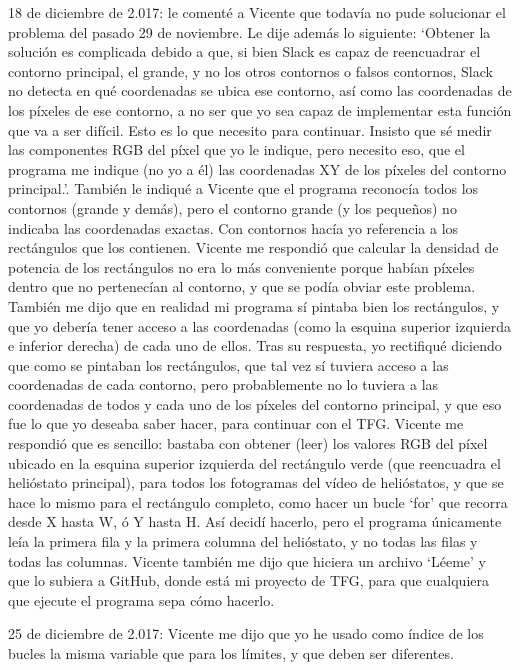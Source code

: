 \documentclass[12pt]{article}
\begin{document}
18 de diciembre de 2.017: le comenté a Vicente que todavía no pude solucionar el problema del pasado 29 de noviembre. Le dije además lo siguiente: ‘Obtener la solución es complicada debido a que, si bien Slack es capaz de reencuadrar el contorno principal, el grande, y no los otros contornos o falsos contornos, Slack no detecta en qué coordenadas se ubica ese contorno, así como las coordenadas de los píxeles de ese contorno, a no ser que yo sea capaz de implementar esta función que va a ser difícil. Esto es lo que necesito para continuar. Insisto que sé medir las componentes RGB del píxel que yo le indique, pero necesito eso, que el programa me indique (no yo a él) las coordenadas XY de los píxeles del contorno principal.’. También le indiqué a Vicente que el programa reconocía todos los contornos (grande y demás), pero el contorno grande (y los pequeños) no indicaba las coordenadas exactas. Con contornos hacía yo referencia a los rectángulos que los contienen. Vicente me respondió que calcular la densidad de potencia de los rectángulos no era lo más conveniente porque habían píxeles dentro que no pertenecían al contorno, y que se podía obviar este problema. También me dijo que en realidad mi programa sí pintaba bien los rectángulos, y que yo debería tener acceso a las coordenadas (como la esquina superior izquierda e inferior derecha) de cada uno de ellos. Tras su respuesta, yo rectifiqué diciendo que como se pintaban los rectángulos, que tal vez sí tuviera acceso a las coordenadas de cada contorno, pero probablemente no lo tuviera a las coordenadas de todos y cada uno de los píxeles del contorno principal, y que eso fue lo que yo deseaba saber hacer, para continuar con el TFG. Vicente me respondió que es sencillo: bastaba con obtener (leer) los valores RGB del píxel ubicado en la esquina superior izquierda del rectángulo verde (que reencuadra el helióstato principal), para todos los fotogramas del vídeo de helióstatos, y que se hace lo mismo para el rectángulo completo, como hacer un bucle ‘for’ que recorra desde X hasta W, ó Y hasta H. Así decidí hacerlo, pero el programa únicamente leía la primera fila y la primera columna del helióstato, y no todas las filas y todas las columnas. Vicente también me dijo que hiciera un archivo ‘Léeme’ y que lo subiera a GitHub, donde está mi proyecto de TFG, para que cualquiera que ejecute el programa sepa cómo hacerlo.

25 de diciembre de 2.017: Vicente me dijo que yo he usado como índice de los bucles la misma variable que para los límites, y que deben ser diferentes.
\end{document}

